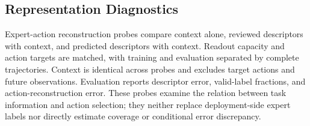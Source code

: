 \subsection{Representation Diagnostics}
\label{app:evaluationdiagnostics}
Expert-action reconstruction probes compare context alone, reviewed descriptors with context, and predicted descriptors with context.
Readout capacity and action targets are matched, with training and evaluation separated by complete trajectories.
Context is identical across probes and excludes target actions and future observations.
Evaluation reports descriptor error, valid-label fractions, and action-reconstruction error.
These probes examine the relation between task information and action selection; they neither replace deployment-side expert labels nor directly estimate coverage or conditional error discrepancy.
